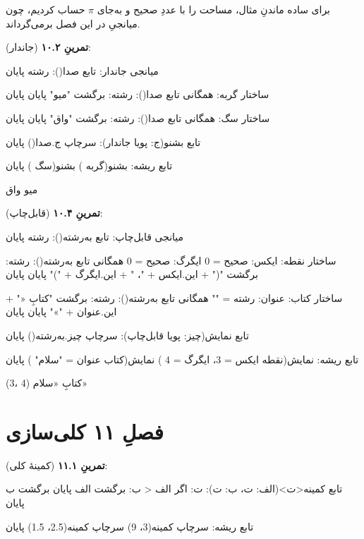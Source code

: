 برای ساده ماندنِ مثال، مساحت را با عددِ صحیح و  به‌جای $\pi$ حساب کردیم، چون میانجیِ  در این فصل  برمی‌گرداند.

\textbf{تمرینِ ۱۰.۲} (جاندار):
\begin{salamfa}
میانجی جاندار:
    تابع صدا(): رشته
پایان

ساختار گربه:
    همگانی تابع صدا(): رشته: برگشت "میو" پایان
پایان

ساختار سگ:
    همگانی تابع صدا(): رشته: برگشت "واق" پایان
پایان

تابع بشنو(ج: پویا جاندار):
    سرچاپ ج.صدا()
پایان

تابع ریشه:
    بشنو(گربه {})
    بشنو(سگ {})
پایان
\end{salamfa}

\begin{progoutfa}
میو
واق
\end{progoutfa}

\textbf{تمرینِ ۱۰.۴} (قابل‌چاپ):
\begin{salamfa}
میانجی قابل‌چاپ:
    تابع به‌رشته(): رشته
پایان

ساختار نقطه:
    ایکس: صحیح = 0
    ایگرگ: صحیح = 0
    همگانی تابع به‌رشته(): رشته:
        برگشت "(" + این.ایکس + "، " + این.ایگرگ + ")"
    پایان
پایان

ساختار کتاب:
    عنوان: رشته = ""
    همگانی تابع به‌رشته(): رشته: برگشت "کتابِ «" + این.عنوان + "»" پایان
پایان

تابع نمایش(چیز: پویا قابل‌چاپ):
    سرچاپ چیز.به‌رشته()
پایان

تابع ریشه:
    نمایش(نقطه { ایکس = 3، ایگرگ = 4 })
    نمایش(کتاب { عنوان = "سلام" })
پایان
\end{salamfa}

\begin{progoutfa}
(3، 4)
کتابِ «سلام»
\end{progoutfa}

\section*{فصلِ ۱۱ کلی‌سازی}
{}

\textbf{تمرینِ ۱۱.۱} (کمینهٔ کلی):
\begin{salamfa}
تابع کمینه<ت>(الف: ت، ب: ت): ت:
    اگر الف < ب:
        برگشت الف
    پایان
    برگشت ب
پایان

تابع ریشه:
    سرچاپ کمینه(3، 9)
    سرچاپ کمینه(2.5، 1.5)
پایان
\end{salamfa}

